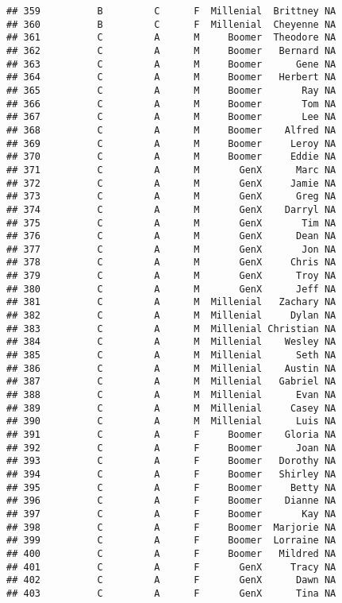 \documentclass[
]{article}
\begin{document}
\begin{verbatim}
## 359          B         C      F  Millenial  Brittney NA
## 360          B         C      F  Millenial  Cheyenne NA
## 361          C         A      M     Boomer  Theodore NA
## 362          C         A      M     Boomer   Bernard NA
## 363          C         A      M     Boomer      Gene NA
## 364          C         A      M     Boomer   Herbert NA
## 365          C         A      M     Boomer       Ray NA
## 366          C         A      M     Boomer       Tom NA
## 367          C         A      M     Boomer       Lee NA
## 368          C         A      M     Boomer    Alfred NA
## 369          C         A      M     Boomer     Leroy NA
## 370          C         A      M     Boomer     Eddie NA
## 371          C         A      M       GenX      Marc NA
## 372          C         A      M       GenX     Jamie NA
## 373          C         A      M       GenX      Greg NA
## 374          C         A      M       GenX    Darryl NA
## 375          C         A      M       GenX       Tim NA
## 376          C         A      M       GenX      Dean NA
## 377          C         A      M       GenX       Jon NA
## 378          C         A      M       GenX     Chris NA
## 379          C         A      M       GenX      Troy NA
## 380          C         A      M       GenX      Jeff NA
## 381          C         A      M  Millenial   Zachary NA
## 382          C         A      M  Millenial     Dylan NA
## 383          C         A      M  Millenial Christian NA
## 384          C         A      M  Millenial    Wesley NA
## 385          C         A      M  Millenial      Seth NA
## 386          C         A      M  Millenial    Austin NA
## 387          C         A      M  Millenial   Gabriel NA
## 388          C         A      M  Millenial      Evan NA
## 389          C         A      M  Millenial     Casey NA
## 390          C         A      M  Millenial      Luis NA
## 391          C         A      F     Boomer    Gloria NA
## 392          C         A      F     Boomer      Joan NA
## 393          C         A      F     Boomer   Dorothy NA
## 394          C         A      F     Boomer   Shirley NA
## 395          C         A      F     Boomer     Betty NA
## 396          C         A      F     Boomer    Dianne NA
## 397          C         A      F     Boomer       Kay NA
## 398          C         A      F     Boomer  Marjorie NA
## 399          C         A      F     Boomer  Lorraine NA
## 400          C         A      F     Boomer   Mildred NA
## 401          C         A      F       GenX     Tracy NA
## 402          C         A      F       GenX      Dawn NA
## 403          C         A      F       GenX      Tina NA

\end{verbatim}
\end{document}
